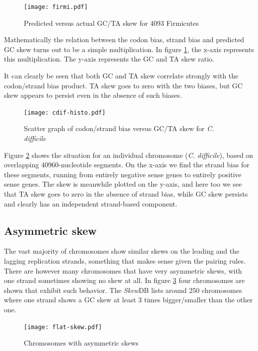 \documentclass[9pt,twocolumn,twoside]{pnas-new}
\begin{document}
\begin{figure}[ht]
\centering
\texttt{[image: firmi.pdf]}
\caption{Predicted versus actual GC/TA skew for 4093 Firmicutes}
\label{fig:the-big-graph}
\end{figure}


Mathematically the relation between the codon bias, strand bias and predicted GC skew turns out to be a simple multiplication. In figure \ref{fig:the-big-graph}, the x-axis represents this multiplication. The y-axis represents the GC and TA skew ratio. 

It can clearly be seen that both GC and TA skew correlate strongly with the codon/strand bias product. TA skew goes to zero with the two biases, but GC skew appears to persist even in the absence of such biases.

\begin{figure}[ht]
\centering
\texttt{[image: cdif-histo.pdf]}
\caption{Scatter graph of codon/strand bias versus GC/TA skew for \emph{C. difficile}}
\label{fig:cdif-scatter}
\end{figure}


Figure \ref{fig:cdif-scatter} shows the situation for an individual chromosome (\emph{C. difficile}), based on overlapping 40960-nucleotide segments. On the x-axis we find the strand bias for these segments, running from entirely negative sense genes to entirely positive sense genes. The skew is meanwhile plotted on the y-axis, and here too we see that TA skew goes to zero in the absence of strand bias, while GC skew persists and clearly has an independent strand-based component.

\subsection*{Asymmetric skew}
The vast majority of chromosomes show similar skews on the leading and the lagging replication strands, something that makes sense given the pairing rules. There are however many chromosomes that have very asymmetric skews, with one strand sometimes showing no skew at all. In figure \ref{fig:asym-skew} four chromosomes are shown that exhibit such behavior. The \emph{Skew}DB lists around 250 chromosomes where one strand shows a GC skew at least 3 times bigger/smaller than the other one.

\begin{figure}[ht]
\centering
\texttt{[image: flat-skew.pdf]}
\caption{Chromosomes with asymmetric skews}
\label{fig:asym-skew}
\end{figure}
\end{document}
